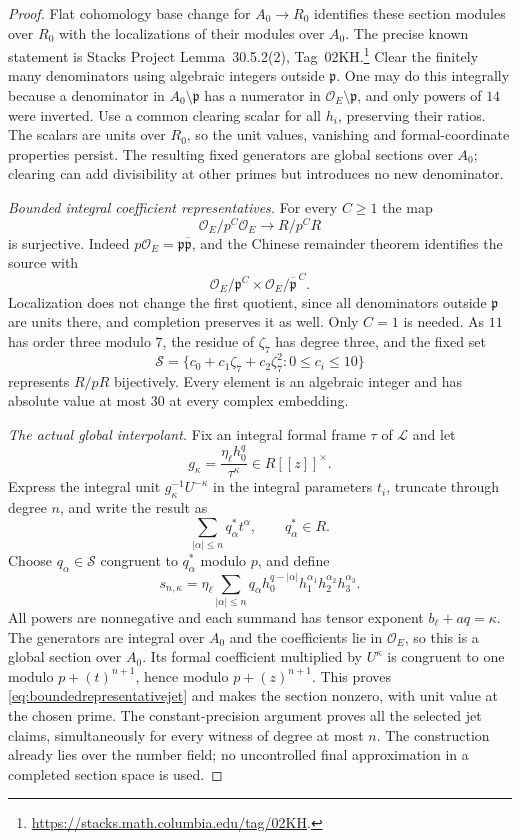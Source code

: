 \begin{proof}
Flat cohomology base change for $A_0\to R_0$ identifies these section modules over $R_0$ with the localizations of their modules over $A_0$.
The precise known statement is Stacks Project Lemma~30.5.2(2), Tag~02KH.\footnote{\url{https://stacks.math.columbia.edu/tag/02KH}.}
Clear the finitely many denominators using algebraic integers outside $\mathfrak p$.
One may do this integrally because a denominator in $A_0\setminus\mathfrak p$ has a numerator in $\mathcal O_E\setminus\mathfrak p$, and only powers of $14$ were inverted.
Use a common clearing scalar for all $h_i$, preserving their ratios.
The scalars are units over $R_0$, so the unit values, vanishing and formal-coordinate properties persist.
The resulting fixed generators are global sections over $A_0$; clearing can add divisibility at other primes but introduces no new denominator.

\emph{Bounded integral coefficient representatives.}
For every $C\ge1$ the map
\[
 \mathcal O_E/p^C\mathcal O_E\longrightarrow R/p^CR
\]
is surjective.
Indeed $p\mathcal O_E=\mathfrak p\overline{\mathfrak p}$, and the Chinese remainder theorem identifies the source with
\[
 \mathcal O_E/\mathfrak p^C\times
 \mathcal O_E/\overline{\mathfrak p}^{\,C}.
\]
Localization does not change the first quotient, since all denominators outside $\mathfrak p$ are units there, and completion preserves it as well.
Only $C=1$ is needed.
As $11$ has order three modulo $7$, the residue of $\zeta_7$ has degree three, and the fixed set
\[
 \mathcal S=\{c_0+c_1\zeta_7+c_2\zeta_7^2:
                 0\le c_i\le10\}
\]
represents $R/pR$ bijectively.
Every element is an algebraic integer and has absolute value at most $30$ at every complex embedding.

\emph{The actual global interpolant.}
Fix an integral formal frame $\tau$ of $\mathcal L$ and let
\[
 g_\kappa=\frac{\eta_\ell h_0^q}{\tau^\kappa}
 \in R[[z]]^\times.
\]
Express the integral unit $g_\kappa^{-1}U^{-\kappa}$ in the integral parameters $t_i$, truncate through degree $n$, and write the result as
\[
 \sum_{|\alpha|\le n}q^*_\alpha t^\alpha,
 \qquad q^*_\alpha\in R.
\]
Choose $q_\alpha\in\mathcal S$ congruent to $q^*_\alpha$ modulo $p$, and define
\begin{equation}\label{eq:boundedglobalinterpolant}
 s_{n,\kappa}
 =\eta_\ell\sum_{|\alpha|\le n}q_\alpha
      h_0^{q-|\alpha|}h_1^{\alpha_1}
      h_2^{\alpha_2}h_3^{\alpha_3}.
\end{equation}
All powers are nonnegative and each summand has tensor exponent $b_\ell+aq=\kappa$.
The generators are integral over $A_0$ and the coefficients lie in $\mathcal O_E$, so this is a global section over $A_0$.
Its formal coefficient multiplied by $U^\kappa$ is congruent to one modulo $p+(t)^{n+1}$, hence modulo $p+(z)^{n+1}$.
This proves \eqref{eq:boundedrepresentativejet} and makes the section nonzero, with unit value at the chosen prime.
The constant-precision argument proves all the selected jet claims, simultaneously for every witness of degree at most $n$.
The construction already lies over the number field; no uncontrolled final approximation in a completed section space is used.


\end{proof}
